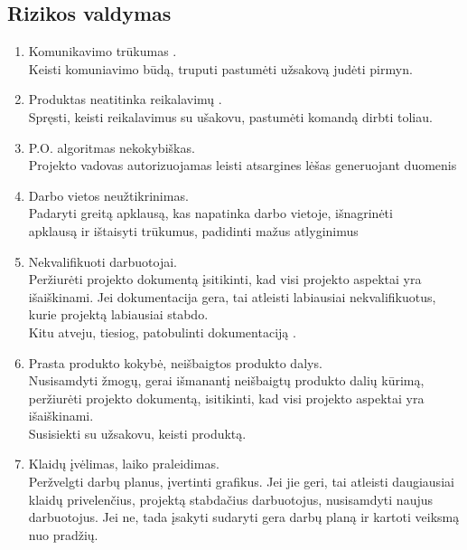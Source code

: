 \documentclass[a4paper,12pt]{article}
\begin{document}
\newpage

\subsection{Rizikos valdymas}
\begin{enumerate}
	\item Komunikavimo tr\= ukumas . \\
 			Keisti komuniavimo būdą, truputi pastum\. eti u\v zsakovą jud\. eti pirmyn.
  			
  	\item Produktas neatitinka reikalavim\k u . \\
		Spr\k esti, keisti reikalavimus su u\v sakovu, pastum\. eti komandą dirbti toliau.
		
	\item P.O. algoritmas nekokybiškas. \\
			Projekto vadovas autorizuojamas leisti atsargines lėšas generuojant duomenis
		
	\item Darbo vietos neu\v ztikrinimas.\\
  			Padaryti greit\k a apklaus\k a, kas napatinka darbo vietoje, i\v snagrin\. eti\\
  			apklaus\k a ir i\v staisyti trūkumus, padidinti ma\v zus atlyginimus
  		
	\item Nekvalifikuoti darbuotojai. \\
			Per\v ziur\. eti projekto dokument\k a \k isitikinti, kad visi projekto aspektai
			yra i\v sai\v skinami.
			Jei dokumentacija gera, tai atleisti labiausiai nekvalifikuotus, kurie projekt\k a labiausiai stabdo. \\
			Kitu atveju, tiesiog, patobulinti dokumentacij\k a
			.
  	
	\item Prasta produkto kokybė, nei\v sbaigtos produkto dalys.\\
			Nusisamdyti \v zmogų, gerai i\v smanantį nei\v sbaigt\k u produkto dali\k u 
			k\= urimą, per\v ziur\. eti projekto dokumentą, isitikinti, 
			kad visi projekto aspektai yra i\v sai\v skinami. \\ 
			Susisiekti su u\v zsakovu, keisti produkt\k a.
		
	\item Klaid\k u \k iv\. elimas, laiko praleidimas.\\
  			Per\v zvelgti darb\k u planus, \k ivertinti grafikus.
  			Jei jie geri, tai atleisti daugiausiai klaid\k u privelen\v cius, projekt\k a
  			stabda\v cius darbuotojus, nusisamdyti naujus darbuotojus. Jei ne, tada \k isakyti
  			sudaryti gera darb\k u plan\k a ir kartoti veiksm\k a nuo prad\v zi\k u.
  		

\end{enumerate}
\end{document}
